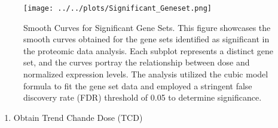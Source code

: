\documentclass[
]{article}
\newenvironment{Shaded}{\begin{snugshade}}{\end{snugshade}}
\newcommand{\AttributeTok}[1]{\textcolor[rgb]{0.77,0.63,0.00}{#1}}
\newcommand{\CommentTok}[1]{\textcolor[rgb]{0.56,0.35,0.01}{\textit{#1}}}
\newcommand{\ConstantTok}[1]{\textcolor[rgb]{0.00,0.00,0.00}{#1}}
\newcommand{\ControlFlowTok}[1]{\textcolor[rgb]{0.13,0.29,0.53}{\textbf{#1}}}
\newcommand{\DecValTok}[1]{\textcolor[rgb]{0.00,0.00,0.81}{#1}}
\newcommand{\FunctionTok}[1]{\textcolor[rgb]{0.00,0.00,0.00}{#1}}
\newcommand{\NormalTok}[1]{#1}
\newcommand{\OtherTok}[1]{\textcolor[rgb]{0.56,0.35,0.01}{#1}}
\newcommand{\SpecialCharTok}[1]{\textcolor[rgb]{0.00,0.00,0.00}{#1}}
\newcommand{\StringTok}[1]{\textcolor[rgb]{0.31,0.60,0.02}{#1}}
\providecommand{\tightlist}{%
  \setlength{\itemsep}{0pt}\setlength{\parskip}{0pt}}
\begin{document}
\begin{Shaded}
\end{Shaded}

\begin{figure}
\centering
\texttt{[image: ../../plots/Significant\_Geneset.png]}
\caption{Smooth Curves for Significant Gene Sets. This figure showcases
the smooth curves obtained for the gene sets identified as significant
in the proteomic data analysis. Each subplot represents a distinct gene
set, and the curves portray the relationship between dose and normalized
expression levels. The analysis utilized the cubic model formula to fit
the gene set data and employed a stringent false discovery rate (FDR)
threshold of 0.05 to determine significance.}
\end{figure}

\begin{enumerate}
\def\labelenumi{\arabic{enumi}.}
\setcounter{enumi}{6}
\tightlist
\item
  Obtain Trend Chande Dose (TCD)
\end{enumerate}
\end{document}

